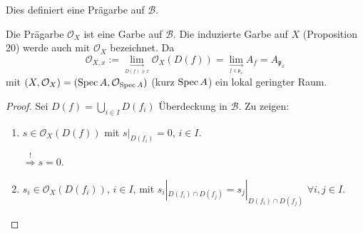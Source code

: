 Dies definiert eine Prägarbe auf $\mathcal{B}$.
\begin{thm}[orig. 33]
  Die Prägarbe $\mathcal{O}_{X}$ ist eine Garbe auf $\mathcal{B}$.
  Die induzierte Garbe auf $X$ (Proposition 20) werde auch mit $\mathcal{O}_{X}$
  bezeichnet. Da
  \[
  \mathcal{O}_{X,x}:=\underset{\underset{D(f)\ni x}{\longrightarrow}}{\lim}\mathcal{O}_{X}(D(f))=\underset{\underset{f\in\mathfrak{p}_{x}}{\longrightarrow}}{\lim}A_{f}=A_{\mathfrak{p}_{x}}
  \]
  mit $(X,\mathcal{O}_{X})=(\operatorname{Spec} A,\mathcal{O}_{\operatorname{Spec} A})$ (kurz $\operatorname{Spec} A$)
  ein lokal geringter Raum.
\end{thm}

\begin{proof}
  Sei $D(f)=\bigcup_{i\in I}D(f_{i})$ Überdeckung in $\mathcal{B}$.
  Zu zeigen:
  \begin{enumerate}
  \item $s\in\mathcal{O}_{X}(D(f))$ mit $s|_{D(f_{i})}=0$, $i\in I$.

    $\overset{!}{\Rightarrow}s=0$.
  \item $s_{i}\in\mathcal{O}_{X}(D(f_{i}))$, $i\in I$, mit $s_{i}|_{D(f_{i})\cap D(f_{j})}=s_{j}|_{D(f_{i})\cap D(f_{j})}$
    $\forall i,j\in I$.


\end{enumerate}
\end{proof}

